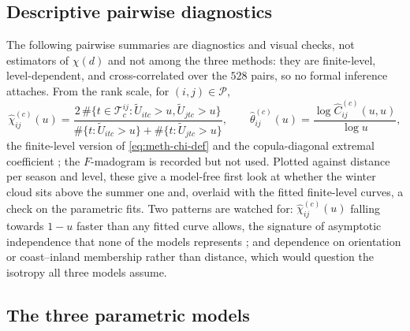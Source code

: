 \subsection{Descriptive pairwise diagnostics}\label{sec:meth-diagnostics}

The following pairwise summaries are diagnostics and visual checks, not estimators of \(\chi(d)\) and not among the three methods: they are finite-level, level-dependent, and cross-correlated over the \(528\) pairs, so no formal inference attaches. From the rank scale, for \((i,j)\in\mathcal P\),
\begin{equation}
  \widehat\chi^{(c)}_{ij}(u)
  =\frac{2\,\#\{t\in\mathcal T^{ij}_c:\widetilde U_{itc}>u,\widetilde U_{jtc}>u\}}
  {\#\{t:\widetilde U_{itc}>u\}+\#\{t:\widetilde U_{jtc}>u\}},
  \qquad
  \widehat\theta^{(c)}_{ij}(u)=\frac{\log\widehat C^{(c)}_{ij}(u,u)}{\log u},
\end{equation}
the finite-level version of \eqref{eq:meth-chi-def} and the copula-diagonal extremal coefficient \citep{coles1999,schlather2003}; the \(F\)-madogram \citep{cooley2006} is recorded but not used. Plotted against distance per season and level, these give a model-free first look at whether the winter cloud sits above the summer one and, overlaid with the fitted finite-level curves, a check on the parametric fits. Two patterns are watched for: \(\widehat\chi^{(c)}_{ij}(u)\) falling towards \(1-u\) faster than any fitted curve allows, the signature of asymptotic independence that none of the models represents \citep{ledford1996,huserwadsworth2022}; and dependence on orientation or coast--inland membership rather than distance, which would question the isotropy all three models assume.

\subsection{The three parametric models}\label{sec:meth-models}

